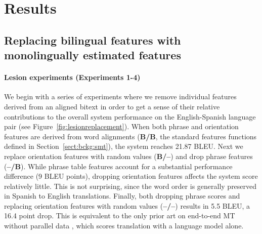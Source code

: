 \documentclass[11pt]{article}
\newcommand{\secref}[1]{Section~\ref{#1}}
\newcommand{\figref}[1]{Figure~\ref{#1}}
\begin{document}



\section{Results} \label{sect:results}

\subsection{Replacing bilingual features with monolingually estimated features}\label{sect:exp:lesions}

\paragraph{Lesion experiments (Experiments 1-4)}

We begin with a series of experiments where we remove individual features derived from an aligned bitext in order to get a sense of their relative contributions to the overall system performance on the English-Spanish language pair (see \figref{fig:lesionreplacement}). When both phrase and orientation features are derived from word alignments ({\bf B/B}, the standard features functions defined in \secref{sect:bckg:smt}), the system reaches 21.87 BLEU.  Next we replace orientation features with random values ({\bf B/--}) and drop phrase features ({\bf --/B}).  While phrase table features account for a substantial performance difference (9 BLEU points), dropping orientation features affects the system score relatively little.  This is not surprising, since the word order is generally preserved in Spanish to English translations.  Finally, both dropping phrase scores and replacing orientation features with random values ({\bf --/--}) results in 5.5 BLEU, a 16.4 point drop.  This is equivalent to the only prior art on end-to-end MT without parallel data \cite{Carbonell2006}, which scores translation with a language model alone.
\end{document}
